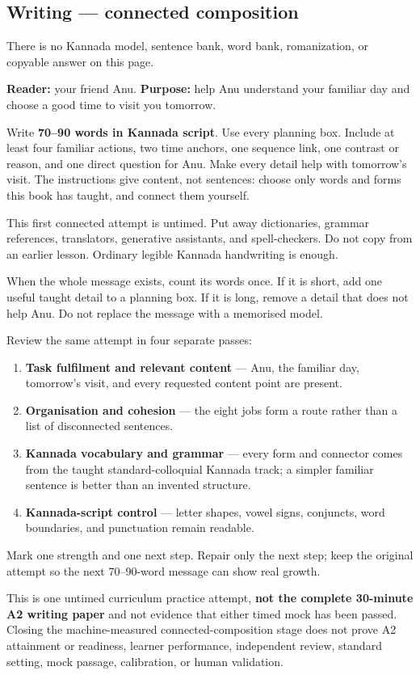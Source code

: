 \subsection*{Writing — connected composition}
There is no Kannada model, sentence bank, word bank, romanization, or copyable answer on this page.

\textbf{Reader:} your friend Anu. \textbf{Purpose:} help Anu understand your familiar day and choose a good time to visit you tomorrow.

Write \textbf{70–90 words in Kannada script}. Use every planning box. Include at least four familiar actions, two time anchors, one sequence link, one contrast or reason, and one direct question for Anu. Make every detail help with tomorrow's visit. The instructions give content, not sentences: choose only words and forms this book has taught, and connect them yourself.

This first connected attempt is untimed. Put away dictionaries, grammar references, translators, generative assistants, and spell-checkers. Do not copy from an earlier lesson. Ordinary legible Kannada handwriting is enough.

When the whole message exists, count its words once. If it is short, add one useful taught detail to a planning box. If it is long, remove a detail that does not help Anu. Do not replace the message with a memorised model.

\begin{tcolorbox}[breakable,colback=teal!4,colframe=teal!35!black,title={Before you move on}]
Review the same attempt in four separate passes:

\begin{enumerate}
\raggedright
  \item \textbf{Task fulfilment and relevant content} — Anu, the familiar day, tomorrow's visit, and every requested content point are present.
  \item \textbf{Organisation and cohesion} — the eight jobs form a route rather than a list of disconnected sentences.
  \item \textbf{Kannada vocabulary and grammar} — every form and connector comes from the taught standard-colloquial Kannada track; a simpler familiar sentence is better than an invented structure.
  \item \textbf{Kannada-script control} — letter shapes, vowel signs, conjuncts, word boundaries, and punctuation remain readable.
\end{enumerate}

Mark one strength and one next step. Repair only the next step; keep the original attempt so the next 70–90-word message can show real growth.

This is one untimed curriculum practice attempt, \textbf{not the complete 30-minute A2 writing paper} and not evidence that either timed mock has been passed. Closing the machine-measured connected-composition stage does not prove A2 attainment or readiness, learner performance, independent review, standard setting, mock passage, calibration, or human validation.
\end{tcolorbox}
